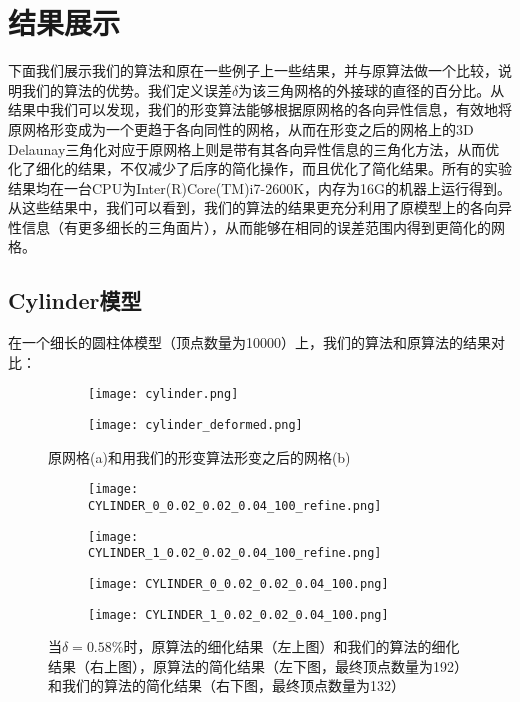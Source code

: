 \section{结果展示}
下面我们展示我们的算法和原在一些例子上一些结果，并与原算法做一个比较，说明我们的算法的优势。我们定义误差$\delta$为该三角网格的外接球的直径的百分比。从结果中我们可以发现，我们的形变算法能够根据原网格的各向异性信息，有效地将原网格形变成为一个更趋于各向同性的网格，从而在形变之后的网格上的3D Delaunay三角化对应于原网格上则是带有其各向异性信息的三角化方法，从而优化了细化的结果，不仅减少了后序的简化操作，而且优化了简化结果。所有的实验结果均在一台CPU为Inter(R)Core(TM)i7-2600K，内存为16G的机器上运行得到。从这些结果中，我们可以看到，我们的算法的结果更充分利用了原模型上的各向异性信息（有更多细长的三角面片），从而能够在相同的误差范围内得到更简化的网格。

\subsection{Cylinder模型}
在一个细长的圆柱体模型（顶点数量为10000）上，我们的算法和原算法的结果对比：
\begin{figure}[H]
  \centering
  \begin{subfigure}[b]{0.4\textwidth}
    \texttt{[image: cylinder.png]}
    \end{subfigure}
    \begin{subfigure}[b]{0.4\textwidth}
      \texttt{[image: cylinder\_deformed.png]}
    \end{subfigure}
    \caption[Cylinder形变结果]{原网格(a)和用我们的形变算法形变之后的网格(b)}
    \label{fig:cylinder-deform}
\end{figure}


\begin{figure}[H]
  \centering
  \begin{subfigure}[b]{0.4\textwidth}
    \texttt{[image: CYLINDER\_0\_0.02\_0.02\_0.04\_100\_refine.png]}
  \end{subfigure}
  \begin{subfigure}[b]{0.4\textwidth}
    \texttt{[image: CYLINDER\_1\_0.02\_0.02\_0.04\_100\_refine.png]}
  \end{subfigure}
  \begin{subfigure}[b]{0.4\textwidth}
    \texttt{[image: CYLINDER\_0\_0.02\_0.02\_0.04\_100.png]}
  \end{subfigure}
  \begin{subfigure}[b]{0.4\textwidth}
    \texttt{[image: CYLINDER\_1\_0.02\_0.02\_0.04\_100.png]}
  \end{subfigure}
  \caption[当$\delta=0.58\%$时Cylinder结果对比]{当$\delta=0.58\%$时，原算法的细化结果（左上图）和我们的算法的细化结果（右上图），原算法的简化结果（左下图，最终顶点数量为192）和我们的算法的简化结果（右下图，最终顶点数量为132）}
  \label{fig:cylinder-res1}
\end{figure}

